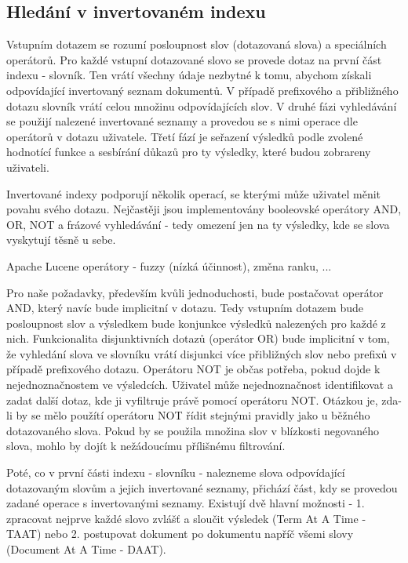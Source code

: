 \documentclass[11pt]{article}
\begin{document}
\subsection{Hledání v invertovaném indexu}
Vstupním dotazem se rozumí posloupnost slov (dotazovaná slova) a
speciálních operátorů. Pro každé vstupní dotazované slovo se provede
dotaz na první část indexu - slovník. Ten vrátí všechny údaje nezbytné k
tomu, abychom získali odpovídající invertovaný seznam dokumentů. V
případě prefixového a přibližného dotazu slovník vrátí celou množinu
odpovídajících slov.  V druhé fázi vyhledávání se použijí nalezené
invertované seznamy a provedou se s nimi operace dle operátorů v dotazu
uživatele. Třetí fází je seřazení výsledků podle zvolené hodnotící
funkce a sesbírání důkazů pro ty výsledky, které budou zobrareny
uživateli.

Invertované indexy podporují několik operací, se kterými může uživatel
měnit povahu svého dotazu. Nejčastěji jsou implementovány booleovské
operátory AND, OR, NOT a frázové vyhledávání - tedy omezení jen na ty
výsledky, kde se slova vyskytují těsně u sebe.

Apache Lucene operátory - fuzzy (nízká účinnost), změna ranku, ...

Pro naše požadavky, především kvůli jednoduchosti, bude postačovat
operátor AND, který navíc bude implicitní v dotazu. Tedy vstupním
dotazem bude posloupnost slov a výsledkem bude konjunkce výsledků
nalezených pro každé z nich. Funkcionalita disjunktivních dotazů
(operátor OR) bude implicitní v tom, že vyhledání slova ve slovníku
vrátí disjunkci více přibližných slov nebo prefixů v případě prefixového
dotazu.  Operátoru NOT je občas potřeba, pokud dojde k nejednoznačnostem
ve výsledcích.  Uživatel může nejednoznačnost identifikovat a zadat
další dotaz, kde ji vyfiltruje právě pomocí operátoru NOT. Otázkou je,
zda-li by se mělo použítí operátoru NOT řídit stejnými pravidly jako u
běžného dotazovaného slova. Pokud by se použila množina slov v blízkosti
negovaného slova, mohlo by dojít k nežádoucímu přílišnému filtrování.

Poté, co v první části indexu - slovníku - nalezneme slova odpovídající
dotazovaným slovům a jejich invertované seznamy, přichází část, kdy se
provedou zadané operace s invertovanými seznamy.  Existují dvě hlavní
možnosti - 1.  zpracovat nejprve každé slovo zvlášť a sloučit výsledek
(Term At A Time - TAAT) nebo 2. postupovat dokument po dokumentu napříč
všemi slovy (Document At A Time
- DAAT).
\end{document}
